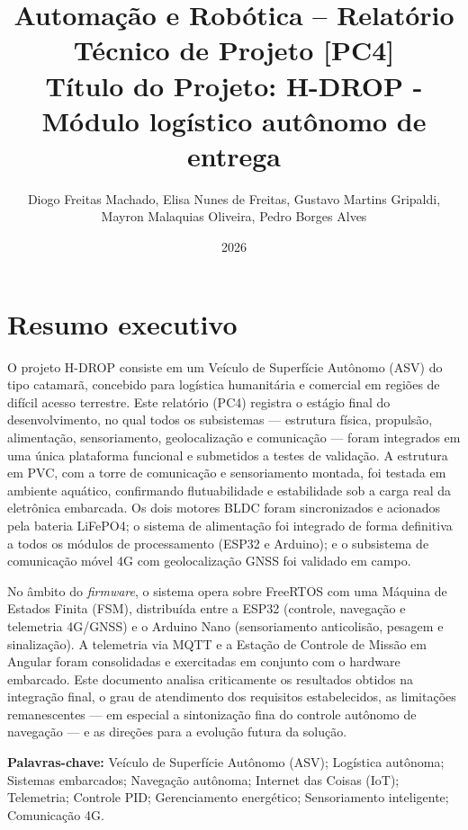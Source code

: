 \documentclass[12pt,a4paper]{article}
\title{\textbf{Automação e Robótica -- Relatório Técnico de Projeto [PC4]}\\
\vspace{0.5cm}
\large Título do Projeto: H-DROP - Módulo logístico autônomo de entrega}
\author{Diogo Freitas Machado, Elisa Nunes de Freitas, Gustavo Martins Gripaldi, Mayron Malaquias Oliveira, Pedro Borges Alves}
\affil{Curso de Engenharia de Computação -- IESB}
\date{2026}
\begin{document}
\maketitle

\section{Resumo executivo}

O projeto H-DROP consiste em um Veículo de Superfície Autônomo (ASV) do tipo catamarã, concebido para logística humanitária e comercial em regiões de difícil acesso terrestre. Este relatório (PC4) registra o estágio final do desenvolvimento, no qual todos os subsistemas — estrutura física, propulsão, alimentação, sensoriamento, geolocalização e comunicação — foram integrados em uma única plataforma funcional e submetidos a testes de validação. A estrutura em PVC, com a torre de comunicação e sensoriamento montada, foi testada em ambiente aquático, confirmando flutuabilidade e estabilidade sob a carga real da eletrônica embarcada. Os dois motores BLDC foram sincronizados e acionados pela bateria LiFePO4; o sistema de alimentação foi integrado de forma definitiva a todos os módulos de processamento (ESP32 e Arduino); e o subsistema de comunicação móvel 4G com geolocalização GNSS foi validado em campo.

No âmbito do \textit{firmware}, o sistema opera sobre FreeRTOS com uma Máquina de Estados Finita (FSM), distribuída entre a ESP32 (controle, navegação e telemetria 4G/GNSS) e o Arduino Nano (sensoriamento anticolisão, pesagem e sinalização). A telemetria via MQTT e a Estação de Controle de Missão em Angular foram consolidadas e exercitadas em conjunto com o hardware embarcado. Este documento analisa criticamente os resultados obtidos na integração final, o grau de atendimento dos requisitos estabelecidos, as limitações remanescentes — em especial a sintonização fina do controle autônomo de navegação — e as direções para a evolução futura da solução.

\vspace{0.5cm}

\noindent \textbf{Palavras-chave:} Veículo de Superfície Autônomo (ASV); Logística autônoma; Sistemas embarcados; Navegação autônoma; Internet das Coisas (IoT); Telemetria; Controle PID; Gerenciamento energético; Sensoriamento inteligente; Comunicação 4G.

\end{document}
